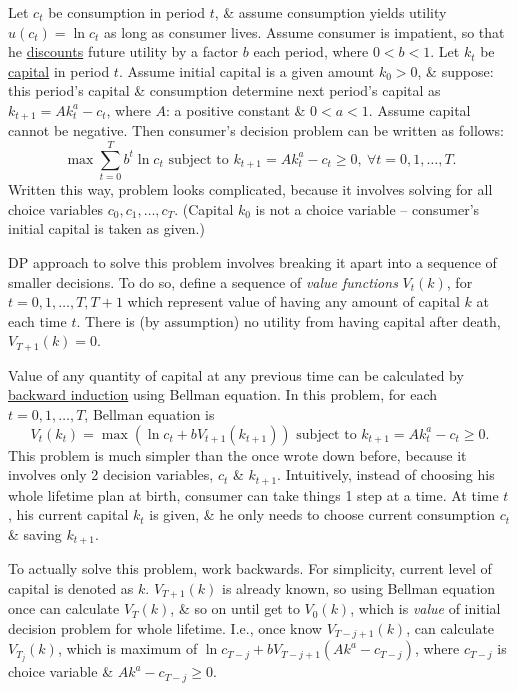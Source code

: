 \documentclass{article}
\begin{document}
\begin{enumerate}
\begin{itemize}
		Let $c_t$ be consumption in period $t$, \& assume consumption yields utility $u(c_t) = \ln c_t$ as long as consumer lives. Assume consumer is impatient, so that he \href{https://en.wikipedia.org/wiki/Discounting}{discounts} future utility by a factor $b$ each period, where $0 < b < 1$. Let $k_t$ be \href{https://en.wikipedia.org/wiki/Capital_(economics)}{capital} in period $t$. Assume initial capital is a given amount $k_0 > 0$, \& suppose: this period's capital \& consumption determine next period's capital as $k_{t+1} = Ak_t^a - c_t$, where $A$: a positive constant \& $0 < a < 1$. Assume capital cannot be negative. Then consumer's decision problem can be written as follows:
		\begin{equation*}
			\max\sum_{t=0}^T b^t\ln c_t\mbox{ subject to } k_{t+1} = Ak_t^a - c_t\ge0,\ \forall t = 0,1,\ldots,T.
		\end{equation*}
		Written this way, problem looks complicated, because it involves solving for all choice variables $c_0,c_1,\ldots,c_T$. (Capital $k_0$ is not a choice variable -- consumer's initial capital is taken as given.)
		
		DP approach to solve this problem involves breaking it apart into a sequence of smaller decisions. To do so, define a sequence of {\it value functions} $V_t(k)$, for $t = 0,1,\ldots,T,T+1$ which represent value of having any amount of capital $k$ at each time $t$. There is (by assumption) no utility from having capital after death, $V_{T+1}(k) = 0$.
		
		Value of any quantity of capital at any previous time can be calculated by \href{https://en.wikipedia.org/wiki/Backward_induction}{backward induction} using Bellman equation. In this problem, for each $t = 0,1,\ldots,T$, Bellman equation is
		\begin{equation*}
			V_t(k_t) = \max(\ln c_t + bV_{t+1}(k_{t+1}))\mbox{ subject to } k_{t+1} = Ak_t^a - c_t\ge0.
		\end{equation*}
		This problem is much simpler than the once wrote down before, because it involves only 2 decision variables, $c_t$ \& $k_{t+1}$. Intuitively, instead of choosing his whole lifetime plan at birth, consumer can take things 1 step at a time. At time $t$, his current capital $k_t$ is given, \& he only needs to choose current consumption $c_t$ \& saving $k_{t+1}$.
		
		To actually solve this problem, work backwards. For simplicity, current level of capital is denoted as $k$. $V_{T+1}(k)$ is already known, so using Bellman equation once can calculate $V_T(k)$, \& so on until get to $V_0(k)$, which is {\it value} of initial decision problem for whole lifetime. I.e., once know $V_{T-j+1}(k)$, can calculate $V_{T_j}(k)$, which is maximum of $\ln c_{T-j} + bV_{T-j+1}(Ak^a - c_{T-j})$, where $c_{T-j}$ is choice variable \& $Ak^a - c_{T-j}\ge0$.
		

\end{itemize}
\end{enumerate}
\end{document}
